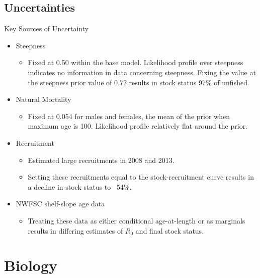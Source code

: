 \documentclass[pdf]{beamer}\usepackage[]{graphicx}\usepackage[]{color}
\begin{document}

\subsection{Uncertainties}
\begin{frame}{Key Sources of Uncertainty}
  \begin{itemize}
    \item Steepness
    \begin{itemize}
      \item Fixed at 0.50 within the base model.  Likelihood profile over steepness indicates no information in data concerning steepness.  Fixing the value at the steepness prior value of 0.72 results in stock status 97\% of unfished.
    \end{itemize}
    \item Natural Mortality
      \begin{itemize}
        \item Fixed at 0.054 for males and females, the mean of the prior when maximum age is 100.  Likelihood profile relatively flat around the prior.
      \end{itemize}
    \item Recruitment 
      \begin{itemize} 
        \item Estimated large recruitments in 2008 and 2013. 
        \item Setting these recruitments equal to the stock-recruitment curve results in a decline in stock status to ~54\%.
      \end{itemize}
    \item{NWFSC shelf-slope age data}
      \begin{itemize}
        \item Treating these data as either conditional age-at-length or as marginals results in differing estimates of $R_0$ and final stock status.
      \end{itemize}
  \end{itemize}
\end{frame}


\section{Biology}
\end{document}
